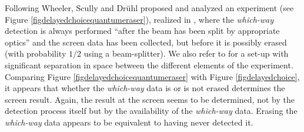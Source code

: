 \documentclass[11pt]{article}
\theoremstyle{definition}
\begin{document}
 Following Wheeler, Scully and Dr\"{u}hl \cite{scully1982quantum} proposed and analyzed an experiment (see Figure \ref{figdelayedchoicequantumeraser}), realized in \cite{kim2000delayed}, where the \emph{which-way} detection is always performed ``after the beam has been split by appropriate optics'' and the screen data has been collected,  but before it is possibly erased (with probability $1/2$ using a beam-splitter).  We also refer to \cite{ma2013quantum} for a set-up with significant separation in space between the different elements of the experiment.
Comparing Figure \ref{figdelayedchoicequantumeraser} with Figure \ref{figdelayedchoice}, it appears that whether the \emph{which-way} data is or is not erased determines the screen result. Again, the result at the screen seems to be determined, not by the detection process itself but by the availability of  the \emph{which-way} data.  Erasing the \emph{which-way} data appears to be equivalent to having never detected it.
\end{document}
